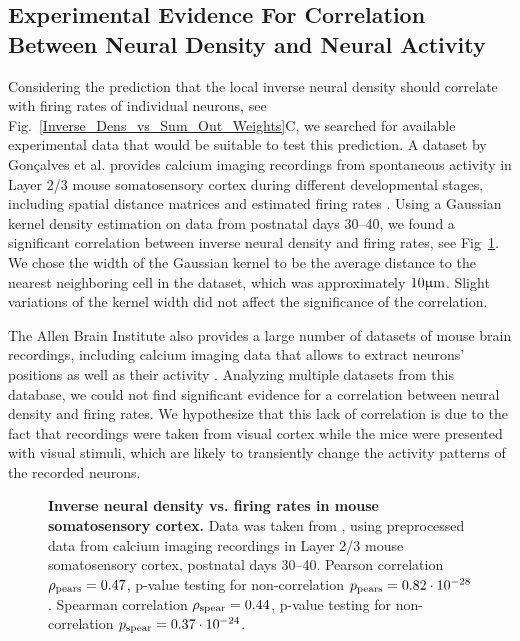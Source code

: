 \documentclass[10pt,letterpaper]{article}
\begin{document}
\subsection*{Experimental Evidence For Correlation Between Neural Density and Neural Activity}

Considering the prediction that the local inverse neural density should correlate with firing rates of individual neurons, see Fig.~\ref{Inverse_Dens_vs_Sum_Out_Weights}C, we searched for available experimental data that would be suitable to test this prediction.  A dataset by Gonçalves et al. provides calcium imaging recordings from spontaneous activity in Layer 2/3 mouse somatosensory cortex during different developmental stages, including spatial distance matrices and estimated firing rates \cite{Goncalves_2013,Goncalves_2017}. Using a Gaussian kernel density estimation on data from postnatal days 30--40, we found a significant correlation between inverse neural density and firing rates, see Fig~\ref{experimental_data}. We chose the width of the Gaussian kernel to be the average distance to the nearest neighboring cell in the dataset, which was approximately $\rm 10 \upmu m$. Slight variations of the kernel width did not affect the significance of the correlation.

The Allen Brain Institute also provides a large number of datasets of mouse brain recordings, including calcium imaging data that allows to extract neurons' positions as well as their activity \cite{AllenBrain}. Analyzing multiple datasets from this database, we could not find significant evidence for a correlation between neural density and firing rates. We hypothesize that this lack of correlation is due to the fact that recordings were taken from visual cortex while the mice were presented with visual stimuli, which are likely to transiently change the activity patterns of the recorded neurons.

\begin{figure}
\centering
\caption{{\bf Inverse neural density vs. firing rates in mouse somatosensory cortex.} Data was taken from \cite{Goncalves_2013,Goncalves_2017}, using preprocessed data from calcium imaging recordings in Layer 2/3 mouse somatosensory cortex, postnatal days 30--40. Pearson correlation $\rho_{\rm pears} = 0.47$, p-value testing for non-correlation $p_{\rm pears}=0.82\cdot 10^{-28}$. Spearman correlation $\rho_{\rm spear} = 0.44$, p-value testing for non-correlation $p_{\rm spear}=0.37\cdot 10^{-24}$.}
\label{experimental_data}
\end{figure}
\end{document}
